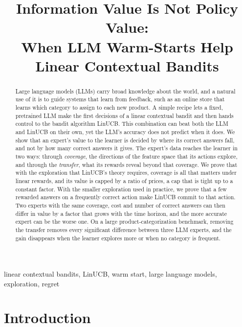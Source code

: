 \documentclass[anon]{alt2027} %
\title[Information Value Is Not Policy Value]{Information Value Is Not Policy Value:\\ When LLM Warm-Starts Help Linear Contextual Bandits}
\newif\ifrevmarks\revmarkstrue
\newenvironment{revised}{\ifrevmarks\color{revcolor}\fi}{}
\begin{document}
\maketitle
\begin{abstract}
\begin{revised}
Large language models (LLMs) carry broad knowledge about the world, and a
natural use of it is to guide systems that learn from feedback, such as an
online store that learns which category to assign to each new product. A
simple recipe lets a fixed, pretrained LLM make the first decisions of a
linear contextual bandit and then hands control to the bandit algorithm
LinUCB. This combination can beat both the LLM and LinUCB on their own, yet
the LLM's accuracy does not predict when it does. We show that an expert's
value to the learner is decided by where its correct answers fall, and not
by how many correct answers it gives. The expert's data reaches the learner
in two ways: through \emph{coverage}, the directions of the feature space
that its actions explore, and through the \emph{transfer}, what its rewards
reveal beyond that coverage. We prove that with the exploration that
LinUCB's theory requires, coverage is all that matters under linear rewards,
and its value is capped by a ratio of prices, a cap that is tight up to a
constant factor. With the smaller exploration used in practice, we prove
that a few rewarded answers on a frequently correct action make LinUCB
commit to that action. Two experts with the same coverage, cost and number
of correct answers can then differ in value by a factor that grows with the
time horizon, and the more accurate expert can be the worse one. On a large
product-categorization benchmark, removing the transfer removes every
significant difference between three LLM experts, and the gain disappears
when the learner explores more or when no category is frequent.
\end{revised}
\end{abstract}

\begin{keywords}%
linear contextual bandits, LinUCB, warm start, large language models, exploration, regret
\end{keywords}


\section{Introduction}
\label{sec:intro}
\end{document}
